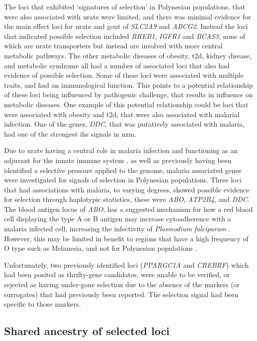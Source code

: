 \documentclass[]{report}
\begin{document}
The loci that exhibited `signatures of selection' in Polynesian
populations, that were also associated with urate were limited, and
there was minimal evidence for the main effect loci for urate and gout
of \emph{SLC2A9} and \emph{ABCG2}. Instead the loci that indicated
possible selection included \emph{RREB1}, \emph{IGFR1} and \emph{BCAS3},
none of which are urate transporters but instead are involved with more
central metabolic pathways. The other metabolic diseases of obesity,
\gls{t2d}, kidney disease, and metabolic syndrome all had a number of
associated loci that also had evidence of possible selection. Some of
these loci were associated with multiple traits, and had an
immunological function. This points to a potential relationship of these
loci being influenced by pathogenic challenge, that results in influence
on metabolic diseases. One example of this potential relationship could
be loci that were associated with obesity and \gls{t2d}, that were also
associated with malarial infection. One of the genes, \emph{DDC}, that
was putatively associated with malaria, had one of the strongest
\gls{ihs} signals in \gls{nzm}.

Due to urate having a central role in malaria infection and functioning
as an adjuvant for the innate immune system \citep{Ames1981, Opitz2009},
as well as previously having been identified a selective pressure
applied to the genome, malaria associated genes were investigated for
signals of selection in Polynesian populations. Three loci that had
associations with malaria, to varying degrees, showed possible evidence
for selection through haplotypic statistics, these were \emph{ABO},
\emph{ATP2B4}, and \emph{DDC}. The blood antigen locus of \emph{ABO},
has a suggested mechanism for how a red blood cell displaying the type A
or B antigen may increase cytoadherence with a malaria infected cell,
increasing the infectivity of \emph{Plasmodium falciparum}
\citep{Cserti2015}. However, this may be limited in benefit to regions
that have a high frequency of O type such as Melanesia, and not for
Polynesian populations \citep{Simmons1962, Zerihun2011}.

Unfortunately, two previously identified loci (\emph{PPARGC1A} and
\emph{CREBRF}) which had been posited as thrifty-gene candidates, were
unable to be verified, or rejected as having under-gone selection due to
the absence of the markers (or surrogates) that had previously been
reported. The selection signal had been specific to those markers.

\subsection{Shared ancestry of selected
loci}\label{shared-ancestry-of-selected-loci}
\end{document}

